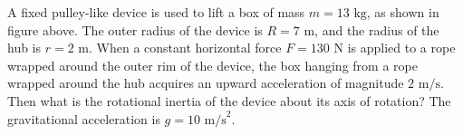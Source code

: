 \documentclass{article}
\begin{document}
A fixed pulley-like device is used to lift a box of mass \( m = 13\text{ kg} \), as shown in figure above. The outer radius of the device is \(R = 7\text{ m} \), and the radius of the hub is \( r = 2\text{ m} \). When a constant horizontal force \( F = 130\text{ N} \) is applied to a rope wrapped around the outer rim of the device, the box hanging from a rope wrapped around the hub acquires an upward acceleration of magnitude \( 2\text{ m/s} \). Then what is the rotational inertia of the device about its axis of rotation? The gravitational acceleration is \( g = 10\text{ m/s}^2 \).
\end{document}
